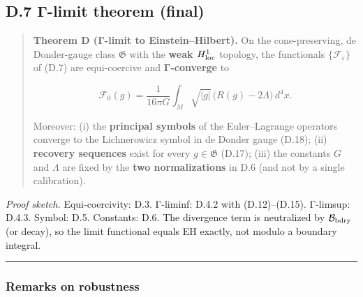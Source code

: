 \documentclass[
]{article}
\numberwithin{equation}{section}
\begin{document}
\hypertarget{d.7-ux3b3-limit-theorem-final}{%
\subsection{D.7 Γ-limit theorem
(final)}\label{d.7-ux3b3-limit-theorem-final}}

\begin{quote}
\textbf{Theorem D (Γ-limit to Einstein--Hilbert).} On the
cone-preserving, de Donder-gauge class \(\mathfrak G\) with the
\textbf{weak \(H^1_{\rm loc}\)} topology, the functionals
\(\{\mathcal F_\varepsilon\}\) of (D.7) are equi-coercive and
\textbf{Γ-converge} to

\[
\boxed{\;
\mathcal F_0(g)=\frac{1}{16\pi G}\int_M \sqrt{|g|}\,\big(R(g)-2\Lambda\big)\,d^4x.
\;}
\]

Moreover: (i) the \textbf{principal symbols} of the Euler--Lagrange
operators converge to the Lichnerowicz symbol in de Donder gauge (D.18);
(ii) \textbf{recovery sequences} exist for every \(g\in\mathfrak G\)
(D.17); (iii) the constants \(G\) and \(\Lambda\) are fixed by the
\textbf{two normalizations} in D.6 (and not by a single calibration).
\end{quote}

\emph{Proof sketch.} Equi-coercivity: D.3. Γ-liminf: D.4.2 with
(D.12)--(D.15). Γ-limsup: D.4.3. Symbol: D.5. Constants: D.6. The
divergence term is neutralized by \(\mathcal B_{\rm bdry}\) (or decay),
so the limit functional equals EH exactly, not modulo a boundary
integral.

\begin{center}\rule{0.5\linewidth}{0.5pt}\end{center}

\hypertarget{remarks-on-robustness}{%
\subsubsection{Remarks on robustness}\label{remarks-on-robustness}}
\end{document}
